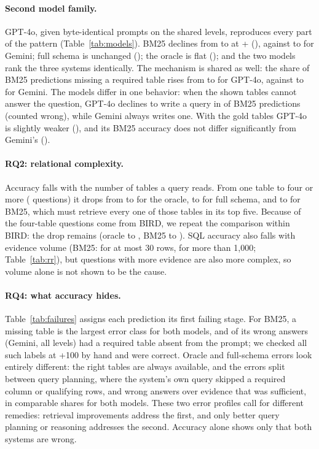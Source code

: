 \documentclass[11pt]{article}
\begin{document}
\paragraph{Second model family.} GPT-4o, given byte-identical prompts on the shared levels, reproduces every part of the pattern (Table~\ref{tab:models}). BM25 declines from \gpBmZeroCommon{} to \gpBmTopCommon{} at +\gpCommonTop{} (\gpBmDelta{}), against \gmBmZeroCommon{} to \gmBmTopCommon{} for Gemini; full schema is unchanged (\gpFsDelta{}); the oracle is flat (\gpOrDelta{}); and the two models rank the three systems identically. The mechanism is shared as well: the share of BM25 predictions missing a required table rises from \gpBmMissedZeroP{} to \gpBmMissedCommonTopP{} for GPT-4o, against \gmBmMissedZeroP{} to \gmBmMissedCommonTopP{} for Gemini. The models differ in one behavior: when the shown tables cannot answer the question, GPT-4o declines to write a query in \gpBmRefusals{} of BM25 predictions (counted wrong), while Gemini always writes one. With the gold tables GPT-4o is slightly weaker (\gpDiffOr{}), and its BM25 accuracy does not differ significantly from Gemini's (\gpDiffBm{}).

\paragraph{RQ2: relational complexity.} Accuracy falls with the number of tables a query reads. From one table to four or more (\nFourTables{} questions) it drops from \orTOne{} to \orTFour{} for the oracle, \fsTOne{} to \fsTFour{} for full schema, and \bmTOne{} to \bmTFour{} for BM25, which must retrieve every one of those tables in its top five. Because \nFourBird{} of the \nFourTables{} four-table questions come from BIRD, we repeat the comparison within BIRD: the drop remains (oracle \orBirdTOne{} to \orBirdTFour{}, BM25 \bmBirdTOne{} to \bmBirdTFour{}). SQL accuracy also falls with evidence volume (BM25: \bmRowsSmallAcc{} for at most 30 rows, \bmRowsHugeAcc{} for more than 1{,}000; Table~\ref{tab:rr}), but questions with more evidence are also more complex, so volume alone is not shown to be the cause.


\paragraph{RQ4: what accuracy hides.} Table~\ref{tab:failures} assigns each prediction its first failing stage. For BM25, a missing table is the largest error class for both models, and \bmMissedOfWrongP{} of its wrong answers (Gemini, all levels) had a required table absent from the prompt; we checked all \nMissedHandChecked{} such labels at +100 by hand and \nMissedHandConfirmed{} were correct. Oracle and full-schema errors look entirely different: the right tables are always available, and the errors split between query planning, where the system's own query skipped a required column or qualifying rows, and wrong answers over evidence that was sufficient, in comparable shares for both models. These two error profiles call for different remedies: retrieval improvements address the first, and only better query planning or reasoning addresses the second. Accuracy alone shows only that both systems are wrong.
\end{document}
